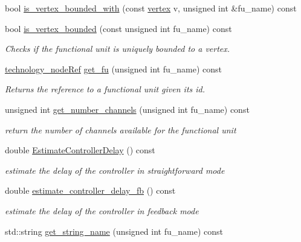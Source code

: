 \begin{DoxyCompactItemize}
bool \hyperlink{classAllocationInformation_af51d3df93977eec2dcab91f789c08d38}{is\+\_\+vertex\+\_\+bounded\+\_\+with} (const \hyperlink{graph_8hpp_abefdcf0544e601805af44eca032cca14}{vertex} v, unsigned int \&fu\+\_\+name) const
\item 
bool \hyperlink{classAllocationInformation_adf7ae2a5e871e9c6ae0a858b5038c68d}{is\+\_\+vertex\+\_\+bounded} (const unsigned int fu\+\_\+name) const
\begin{DoxyCompactList}\small\item\em Checks if the functional unit is uniquely bounded to a vertex. \end{DoxyCompactList}\item 
\hyperlink{technology__node_8hpp_a33dd193b7bd6b987bf0d8a770a819fa7}{technology\+\_\+node\+Ref} \hyperlink{classAllocationInformation_a3eac54b073542febf94679ba50dc5f72}{get\+\_\+fu} (unsigned int fu\+\_\+name) const
\begin{DoxyCompactList}\small\item\em Returns the reference to a functional unit given its id. \end{DoxyCompactList}\item 
unsigned int \hyperlink{classAllocationInformation_af0d620492405831a57abd8dc83eac3fc}{get\+\_\+number\+\_\+channels} (unsigned int fu\+\_\+name) const
\begin{DoxyCompactList}\small\item\em return the number of channels available for the functional unit \end{DoxyCompactList}\item 
double \hyperlink{classAllocationInformation_af60a2374f76674223eba6246e474f63c}{Estimate\+Controller\+Delay} () const
\begin{DoxyCompactList}\small\item\em estimate the delay of the controller in straightforward mode \end{DoxyCompactList}\item 
double \hyperlink{classAllocationInformation_a0d6e8c03de225226eeadc0ac793e9837}{estimate\+\_\+controller\+\_\+delay\+\_\+fb} () const
\begin{DoxyCompactList}\small\item\em estimate the delay of the controller in feedback mode \end{DoxyCompactList}\item 
std\+::string \hyperlink{classAllocationInformation_a184fc8351b07d9fa39a576bf7dd97133}{get\+\_\+string\+\_\+name} (unsigned int fu\+\_\+name) const

\end{DoxyCompactItemize}
